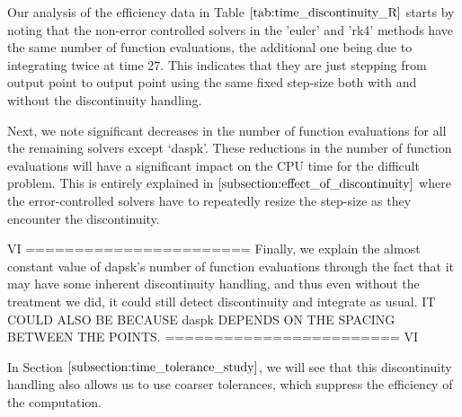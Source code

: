 Our analysis of the efficiency data in Table $\ref{tab:time_discontinuity_R}$ starts by noting that the non-error controlled solvers in the 'euler' and 'rk4' methods have the same number of function evaluations, the additional one being due to integrating twice at time 27. This indicates that they are just stepping from output point to output point using the same fixed step-size both with and without the discontinuity handling.

Next, we note significant decreases in the number of function evaluations for all the remaining solvers except `daspk'. These reductions in the number of function evaluations will have a significant impact on the CPU time for the difficult problem. This is entirely explained in $\ref{subsection:effect_of_discontinuity}$ where the error-controlled solvers have to repeatedly resize the step-size as they encounter the discontinuity.

VI =======================
Finally, we explain the almost constant value of dapsk's number of function evaluations through the fact that it may have some inherent discontinuity handling, and thus even without the treatment we did, it could still detect discontinuity and integrate as usual. IT COULD ALSO BE BECAUSE daspk DEPENDS ON THE SPACING BETWEEN THE POINTS.
======================== VI

In Section $\ref{subsection:time_tolerance_study}$, we will see that this discontinuity handling also allows us to use coarser tolerances, which suppress the efficiency of the computation.

